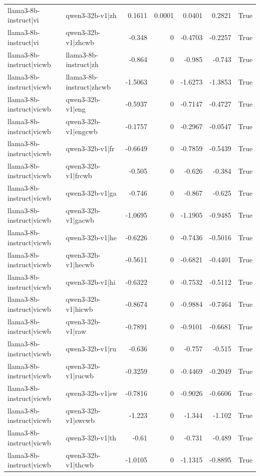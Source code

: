 \begin{table}
\begin{tabular}{l l r r r r l}
llama3-8b-instruct|vi & qwen3-32b-v1|zh & 0.1611 & 0.0001 & 0.0401 & 0.2821 & True \\
llama3-8b-instruct|vi & qwen3-32b-v1|zhcwb & -0.348 & 0 & -0.4703 & -0.2257 & True \\
llama3-8b-instruct|vicwb & llama3-8b-instruct|zh & -0.864 & 0 & -0.985 & -0.743 & True \\
llama3-8b-instruct|vicwb & llama3-8b-instruct|zhcwb & -1.5063 & 0 & -1.6273 & -1.3853 & True \\
llama3-8b-instruct|vicwb & qwen3-32b-v1|eng & -0.5937 & 0 & -0.7147 & -0.4727 & True \\
llama3-8b-instruct|vicwb & qwen3-32b-v1|engcwb & -0.1757 & 0 & -0.2967 & -0.0547 & True \\
llama3-8b-instruct|vicwb & qwen3-32b-v1|fr & -0.6649 & 0 & -0.7859 & -0.5439 & True \\
llama3-8b-instruct|vicwb & qwen3-32b-v1|frcwb & -0.505 & 0 & -0.626 & -0.384 & True \\
llama3-8b-instruct|vicwb & qwen3-32b-v1|ga & -0.746 & 0 & -0.867 & -0.625 & True \\
llama3-8b-instruct|vicwb & qwen3-32b-v1|gacwb & -1.0695 & 0 & -1.1905 & -0.9485 & True \\
llama3-8b-instruct|vicwb & qwen3-32b-v1|he & -0.6226 & 0 & -0.7436 & -0.5016 & True \\
llama3-8b-instruct|vicwb & qwen3-32b-v1|hecwb & -0.5611 & 0 & -0.6821 & -0.4401 & True \\
llama3-8b-instruct|vicwb & qwen3-32b-v1|hi & -0.6322 & 0 & -0.7532 & -0.5112 & True \\
llama3-8b-instruct|vicwb & qwen3-32b-v1|hicwb & -0.8674 & 0 & -0.9884 & -0.7464 & True \\
llama3-8b-instruct|vicwb & qwen3-32b-v1|raw & -0.7891 & 0 & -0.9101 & -0.6681 & True \\
llama3-8b-instruct|vicwb & qwen3-32b-v1|ru & -0.636 & 0 & -0.757 & -0.515 & True \\
llama3-8b-instruct|vicwb & qwen3-32b-v1|rucwb & -0.3259 & 0 & -0.4469 & -0.2049 & True \\
llama3-8b-instruct|vicwb & qwen3-32b-v1|sw & -0.7816 & 0 & -0.9026 & -0.6606 & True \\
llama3-8b-instruct|vicwb & qwen3-32b-v1|swcwb & -1.223 & 0 & -1.344 & -1.102 & True \\
llama3-8b-instruct|vicwb & qwen3-32b-v1|th & -0.61 & 0 & -0.731 & -0.489 & True \\
llama3-8b-instruct|vicwb & qwen3-32b-v1|thcwb & -1.0105 & 0 & -1.1315 & -0.8895 & True \\

\end{tabular}
\end{table}
